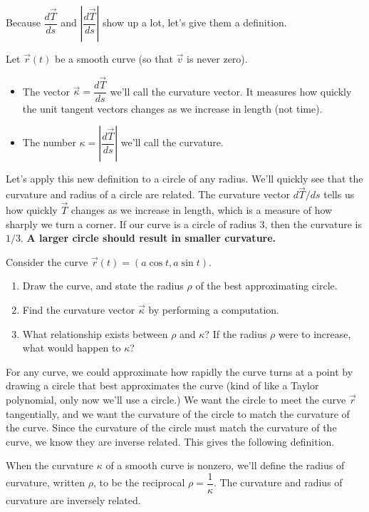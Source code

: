 Because $\dfrac{d\vec T}{ds}$ and $\left|\dfrac{d\vec T}{ds}\right|$ show up a lot, let's give them a definition.
\begin{definition}\label{def:curvature}
 Let $\vec r(t)$ be a smooth curve (so that $\vec v$ is never zero).
\begin{itemize}
 \item The vector $\vec \kappa = \dfrac{d\vec T}{ds}$ we'll call the curvature vector. It measures how quickly the unit tangent vectors changes as we increase in length (not time).
 \item The number $\kappa = \left|\dfrac{d\vec T}{ds}\right|$ we'll call the curvature.
\end{itemize}
\end{definition}


Let's apply this new definition to a circle of any radius.  We'll quickly see that the curvature and radius of a circle are related.
The curvature vector $d\vec T/ds$ tells us how quickly $\vec T$ changes as we increase in length, which is a measure of how sharply we turn a corner.  If our curve is a circle of radius $3$, then the curvature is $1/3$.  \textbf{A larger circle should result in smaller curvature.  }

\begin{problem}
 Consider the curve $\vec r(t)=(a\cos t, a\sin t)$.
 \begin{enumerate}
  \item Draw the curve, and state the radius $\rho$ of the best approximating circle.
  \item Find the curvature vector $\vec \kappa$ by performing a computation.
  \item What relationship exists between $\rho$ and $\kappa$?  If the radius $\rho$ were to increase, what would happen to $\kappa$?
 \end{enumerate}
\end{problem}

For any curve, we could approximate how rapidly the curve turns at a point by drawing a circle that best approximates the curve (kind of like a Taylor polynomial, only now we'll use a circle.) We want the circle to meet the curve $\vec r$ tangentially, and we want the curvature of the circle to match the curvature of the curve. Since the curvature of the circle must match the curvature of the curve, we know they are inverse related.  This gives the following definition.

\begin{definition}%
When the curvature $\kappa$ of a smooth curve is nonzero, we'll define the radius of curvature, written $\rho$, to be the reciprocal $\rho = \dfrac{1}{\kappa}$. The curvature and radius of curvature are inversely related. 
\end{definition}



